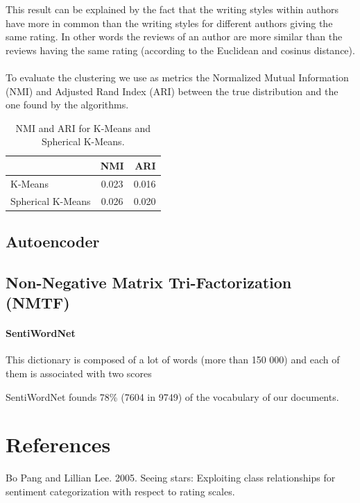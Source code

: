 \documentclass{article}
\begin{document}
This result can be explained by the fact that the writing styles within authors have more in common than the writing styles for different authors giving the same rating. In other words the reviews of an author are more similar than the reviews having the same rating (according to the Euclidean and cosinus distance).
\\\\
To evaluate the clustering we use as metrics the Normalized Mutual Information (NMI) and Adjusted Rand Index (ARI) between the true distribution and the one found by the algorithms.

\begin{table}[H] \label{tab:kmeans_nmi_ari}
\centering
\begin{tabular}{|l|c|r|}
  \hline
  & NMI & ARI \\
  \hline
  K-Means & 0.023 & 0.016 \\
  Spherical K-Means & 0.026 & 0.020 \\
  \hline
\end{tabular}
\caption{NMI and ARI for K-Means and Spherical K-Means.}
\end{table}



\subsection{Autoencoder}



\subsection{Non-Negative Matrix Tri-Factorization (NMTF)}

\paragraph{SentiWordNet}
This dictionary is composed of a lot of words (more than 150 000) and each of them is associated with two scores

SentiWordNet founds 78\% (7604 in 9749) of the vocabulary of our documents.



\section{References}
Bo Pang and Lillian Lee. 2005. Seeing stars: Exploiting class relationships for sentiment categorization with respect to rating scales.
\end{document}
